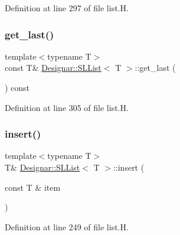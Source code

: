 Definition at line 297 of file list.\+H.

\mbox{\label{class_designar_1_1_s_l_list_add24dd761d9c1ed77a028889beb560c2}} 
\subsubsection{\texorpdfstring{get\+\_\+last()}{get\_last()}\hspace{0.1cm}{\footnotesize\ttfamily [2/2]}}
{\footnotesize\ttfamily template$<$typename T$>$ \\
const T\& \hyperlink{class_designar_1_1_s_l_list}{Designar\+::\+S\+L\+List}$<$ T $>$\+::get\+\_\+last (\begin{DoxyParamCaption}{ }\end{DoxyParamCaption}) const\hspace{0.3cm}{\ttfamily [inline]}}



Definition at line 305 of file list.\+H.

\mbox{\label{class_designar_1_1_s_l_list_a4a016c1bb14040d6abb8b8eee81b71e9}} 
\subsubsection{\texorpdfstring{insert()}{insert()}\hspace{0.1cm}{\footnotesize\ttfamily [1/2]}}
{\footnotesize\ttfamily template$<$typename T$>$ \\
T\& \hyperlink{class_designar_1_1_s_l_list}{Designar\+::\+S\+L\+List}$<$ T $>$\+::insert (\begin{DoxyParamCaption}\item[{const T \&}]{item }\end{DoxyParamCaption})\hspace{0.3cm}{\ttfamily [inline]}}



Definition at line 249 of file list.\+H.

\mbox{\label{class_designar_1_1_s_l_list_aea19d4f4eed343c1fe28517de0368be9}} 
